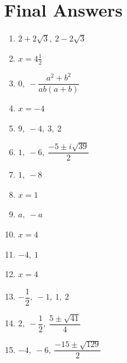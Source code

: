 \documentclass[12pt,a4paper]{article}
\begin{document}
\vspace{0.6cm}
\section*{Final Answers}

\begin{enumerate}[label=\textbf{Example \arabic*.}, leftmargin=2.5em]
	\item \(2 + 2\sqrt{3},\ 2 - 2\sqrt{3}\)
	
	\item \(x = 4\frac{1}{2}\)
	
	\item \(0,\ -\dfrac{a^2 + b^2}{ab(a + b)}\)
	
	\item \(x = -4\)
	
	\item \(9,\ -4,\ 3,\ 2\)
	
	\item \(1,\ -6,\ \dfrac{-5 \pm i\sqrt{39}}{2}\)
	
	\item \(1,\ -8\)
	
	\item \(x = 1\)
	
	\item \(a,\ -a\)
	
	\item \(x = 4\)
	
	\item \(-4,\ 1\)
	
	\item \(x = 4\)
	
	\item \(-\dfrac{1}{2},\ -1,\ 1,\ 2\)
	
	\item \(2,\ -\dfrac{1}{2},\ \dfrac{5 \pm \sqrt{41}}{4}\)
	
	\item \(-4,\ -6,\ \dfrac{-15 \pm \sqrt{129}}{2}\)
\end{enumerate}
\end{document}
